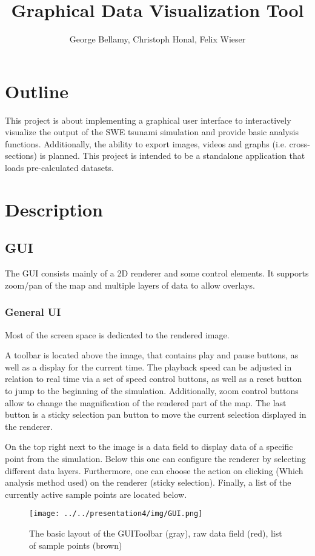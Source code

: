 \documentclass[paper=a4]{proc}
\title{Graphical Data Visualization Tool}
\author{George Bellamy, Christoph Honal, Felix Wieser}
\begin{document}
	\maketitle
	\thispagestyle{plain}	%
	\section{Outline}
		This project is about implementing a graphical user interface to interactively visualize the output of the SWE tsunami simulation and provide basic analysis functions. Additionally, the ability to export images, videos and graphs (i.e. cross-sections) is planned. This project is intended to be a standalone application that loads pre-calculated datasets.
	\section{Description}
		\subsection{GUI}
			The GUI consists mainly of a 2D renderer and some control elements. It  supports zoom/pan of the map and multiple layers of data to allow overlays.
			\subsubsection{General UI}
			Most of the screen space is dedicated to the rendered image.
			
			A toolbar is located above the image, that contains play and pause buttons, as well as a display for the current time. The playback speed can be adjusted in relation to real time via a set of speed control buttons, as well as a reset button to jump to the beginning of the simulation. Additionally, zoom control buttons allow to change the magnification of the rendered part of the map. The last button is a sticky selection pan button to move the current selection displayed in the renderer.
			
			On the top right next to the image is a data field to display data of a specific point from the simulation. Below this one can configure the renderer by selecting different data layers. Furthermore, one can choose the action on clicking (Which analysis method used) on the renderer (sticky selection). Finally, a list of the currently active sample points are located below.
			
			\begin{figure}
				\texttt{[image: ../../presentation4/img/GUI.png]}
				\caption*{\centering The basic layout of the GUI\newline Toolbar (gray), raw data field (red), list of sample points (brown)}
			\end{figure}
			
\end{document}
